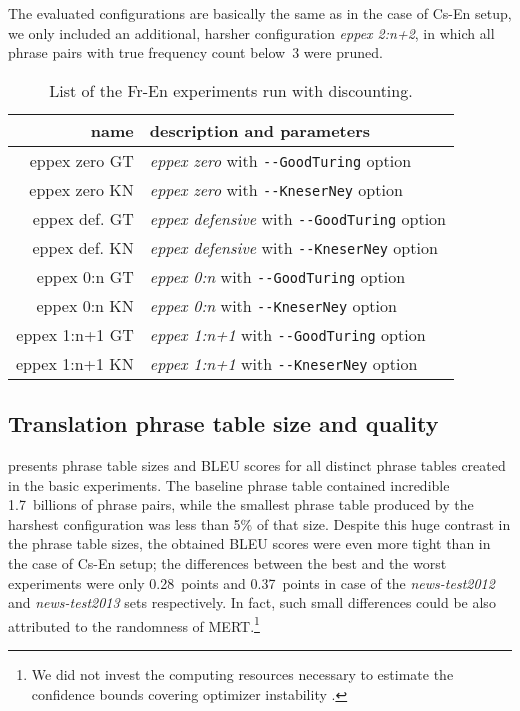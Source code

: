 The evaluated \eppex{} configurations are basically the same as in the case of Cs-En setup,
we only included an additional, harsher configuration \emph{eppex 2:n+2}, in which all phrase
pairs with true frequency count below~3 were pruned.

\begin{table}[ht]
\centering
\begin{tabular}{ r p{10cm} }
name & description and parameters \\
\hline
\hline
eppex zero GT & \emph{eppex zero} with \verb|--GoodTuring| option \\
eppex zero KN & \emph{eppex zero} with \verb|--KneserNey| option \\
eppex def. GT & \emph{eppex defensive} with \verb|--GoodTuring| option \\
eppex def. KN & \emph{eppex defensive} with \verb|--KneserNey| option \\
eppex 0:n GT  & \emph{eppex 0:n} with \verb|--GoodTuring| option \\
eppex 0:n KN  & \emph{eppex 0:n} with \verb|--KneserNey| option \\
eppex 1:n+1 GT & \emph{eppex 1:n+1} with \verb|--GoodTuring| option \\
eppex 1:n+1 KN & \emph{eppex 1:n+1} with \verb|--KneserNey| option \\
\hline
\hline
\end{tabular}
\caption{\label{fr-en-80-smoothed-scenarios}
List of the Fr-En experiments run with discounting.}
\end{table}

\subsection{Translation phrase table size and quality}

 presents phrase table sizes and BLEU scores for all
distinct phrase tables created in the basic experiments.
The baseline phrase table contained incredible 1.7~billions of phrase pairs,
while the smallest phrase table produced by the harshest \eppex{} configuration
was less than 5\% of that size.
Despite this huge contrast in the phrase table sizes, the obtained BLEU scores
were even more tight than in the case of Cs-En setup;
the differences between the best and the worst experiments were only 0.28~points
and 0.37~points in case of the \emph{news-test2012} and \emph{news-test2013} sets
respectively.
In fact, such small differences could be also attributed to the randomness of
MERT.\footnote{We did not invest the computing resources necessary to estimate
the confidence bounds covering optimizer instability \citep{clark:optimizerinstability}.}


